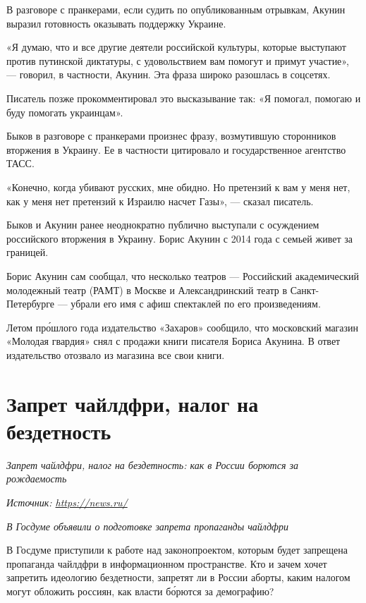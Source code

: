 В разговоре с пранкерами, если судить по опубликованным отрывкам,
Акунин выразил готовность оказывать поддержку Украине.

«Я думаю, что и все другие деятели российской культуры,
которые выступают против путинской диктатуры,
с удовольствием вам помогут и примут участие»,
--- говорил, в частности, Акунин.
Эта фраза широко разошлась в соцсетях.

Писатель позже прокомментировал это высказывание так:
«Я помогал, помогаю и буду помогать украинцам».

Быков в разговоре с пранкерами произнес фразу,
возмутившую сторонников вторжения в Украину.
Ее в частности цитировало и государственное агентство ТАСС.

«Конечно, когда убивают русских, мне обидно.
Но претензий к вам у меня нет, как у меня нет претензий
к Израилю насчет Газы», — сказал писатель.

Быков и Акунин ранее неоднократно публично выступали
с осуждением российского вторжения в Украину.
Борис Акунин с 2014 года с семьей живет за границей.

Борис Акунин сам сообщал, что несколько театров
--- Российский академический молодежный театр (РАМТ)
в Москве и Александринский театр в Санкт-Петербурге
--- убрали его имя с афиш спектаклей по его произведениям.

Летом пр\'{о}шлого года издательство «Захаров» сообщило,
что московский магазин «Молодая гвардия» снял с продажи
книги писателя Бориса Акунина.
В ответ издательство отозвало из магазина все свои книги.


\newpage
\section{Запрет чайлдфри, налог на бездетность}

\textit{Запрет чайлдфри, налог на бездетность: как в России борются за рождаемость}

\textit{Источник: \url{https://news.ru/}}

\textit{В Госдуме объявили о подготовке запрета пропаганды чайлдфри}

В Госдуме приступили к работе над законопроектом,
которым будет запрещена пропаганда чайлдфри в информационном
пространстве.
Кто и зачем хочет запретить идеологию бездетности,
запретят ли в России аборты,
каким налогом могут обложить россиян,
как власти б\'{о}рются за демографию?

